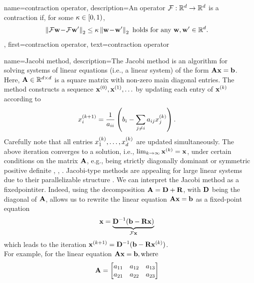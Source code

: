 {name={contraction operator},
	description={An operator $\mathcal{F}: \mathbb{R}^{d} \rightarrow \mathbb{R}^{d}$ 
		is a contraction if, for some $\kappa \in [0,1)$,
		\begin{equation} 
			\nonumber
			\left\Vert { \mathcal{F}{\bf w}\!-\!\mathcal{F}{\bf w}'} \right\Vert_{2}  \leq  \kappa	\left\Vert {{\bf w}\!-\!{\bf w}'} \right\Vert_{2} \mbox{ holds for any } {\bf w},{\bf w}' \in \mathbb{R}^{d}.
		\end{equation}},
	first={contraction operator},
	text={contraction operator}
}

{name={Jacobi method},
	description={The Jacobi method is an \gls{algorithm}  
		for solving systems of linear equations (i.e., a linear system) of the form ${\bf A}{\bf x}= \mathbf{b}$.  
		Here, ${\bf A} \in \mathbb{R}^{d \times d}$ is a square matrix with 
		non-zero main diagonal entries. The method constructs a sequence ${\bf x}^{(0)}, {\bf x}^{(1)}, \ldots$ 
		by updating each entry of $\mathbf{x}^{(k)}$ according to 
		\[
		x_i^{(k+1)} = \frac{1}{a_{ii}} \left( b_i - \sum_{j \neq i} a_{ij} x_j^{(k)} \right).
		\]
		Carefully note that all entries $x^{(k)}_{1}, \ldots, x^{(k)}_{d}$ are updated simultaneously.
		The above iteration converges to a solution, i.e., $\lim_{k \rightarrow \infty} {\bf x}^{(k)}={\bf x}$, 
		under certain conditions on the matrix ${\bf A}$, e.g., being strictly 
		diagonally dominant or symmetric positive  definite \cite{GolubVanLoanBook}, \cite{Horn91}, \cite{StrangLinAlg2016}. 
		Jacobi-type methods are appealing for large linear systems due to their parallelizable structure \cite{ParallelDistrBook}.
		We can interpret the Jacobi method as a \gls{fixedpointiter}. Indeed, using the decomposition ${\bf A} = {\bf D} + {\bf R}$, with ${\bf D}$ being the 
		diagonal of ${\bf A}$, allows us to rewrite the linear equation ${\bf A} {\bf x} = {\bf b}$ as a fixed-point equation  
		\[
		\mathbf{x} = \underbrace{{\bf D}^{-1}(\mathbf{b} - {\bf R} \mathbf{x})}_{\mathcal{F} {\bf x}}
		\]
		which leads to the iteration ${\bf x}^{(k+1)} = {\bf D}^{-1}(\mathbf{b} - {\bf R} {\bf x}^{(k)})$.
		\\
		For example, for the linear equation ${\bf A} \mathbf{x} = \mathbf{b}, \text{where}$ 
		 \[
		 {\bf A} = \begin{bmatrix}
		 	a_{11} & a_{12} & a_{13} \\
		 	a_{21} & a_{22} & a_{23} \\

\end{bmatrix}\]}}
